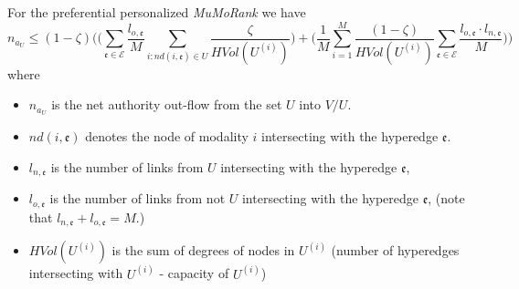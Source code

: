 \documentclass{fundam}
\newcommand{\HEM}{\mathcal{E}}
\newcommand{\hem}{\mathfrak{e}}
\newcommand{\N}{ V }
\begin{document}
\begin{theorem} \label{thMPRlimitd0}
For the preferential personalized \emph{MuMoRank}
we have
$$n_{a_U}\le
  (1-\zeta ) \Bigg(\Big( \sum_{\hem\in \HEM }\frac{l_{o,\hem}}{M}\sum_{i:nd(i,\hem)\in U}\frac{\zeta }{HVol(U^{(i)})}\Big)+
  \Big(\frac1M\sum_{i=1}^M\frac{(1-\zeta) }{ HVol(U^{(i)})}   \sum_{\hem\in \HEM }\frac{l_{o,\hem}\cdot l_{n,\hem}}{M}  \Big)\Bigg)
$$
where
\begin{itemize}
\itemsep=0.95pt
\item $n_{a_U}$ is the net authority out-flow from the  set $U$ into $\N / U$.
\item  $nd(i,\hem)$ denotes the node of modality $i$ intersecting with the hyperedge $\hem$.
\item  $l_{n,\hem}$ is the number of links from $U$ intersecting with the hyperedge $\hem$,
\item
 $l_{o,\hem}$ is the number of links from not $U$ intersecting with the hyperedge $\hem$, (note that $l_{n,\hem}+l_{o,\hem}=M$.)
\item  $HVol(U^{(i)})$ is the sum of  degrees of nodes in  $U^{(i)}$ (number of   hyperedges intersecting with  $U^{(i)}$ -  capacity of $U^{(i)}$) \QED
\end{itemize}
\end{theorem}
\end{document}
